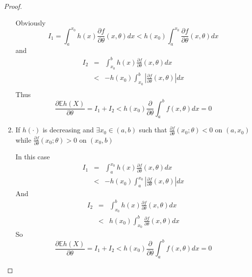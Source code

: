\documentclass{article}
\newcommand{\pd}[2]{
  \frac{\partial #1}{\partial #2}
}
\newcommand{\opd}[1]{
  \frac{\partial}{\partial #1}
}
\newcommand{\E}{
  \mathbb{E}
}
\newcommand{\1}[1]{
  \mathbf{1}_{\{#1\}}
}
\begin{document}
\begin{proof}
\begin{enumerate}
    Obviously
    \[
    I_1 = \int_a^{x_0} h(x) \pd{f}{\theta}(x, \theta) dx
    < h(x_0) \int_a^{x_0} \pd{f}{\theta}(x, \theta) dx
    \]
    and
    \begin{eqnarray*}
      I_2 &=& \int_{x_0}^b h(x) \pd{f}{\theta}(x, \theta) dx \\
      &<& -h(x_0) \int_{x_0}^b \left| \pd{f}{\theta}(x, \theta) \right| dx \\
    \end{eqnarray*}
    Thus
    \[
    \pd{\E h(X)}{\theta}
    = I_1 + I_2
    < h(x_0) \opd{\theta} \int_a^b f(x, \theta) dx = 0
    \]
  \item If $h(\cdot)$ is decreasing and $\exists x_0 \in (a, b)$ such that 
    $\pd{f}{\theta}(x_0; \theta) < 0$ on $(a, x_0)$  while
    $\pd{f}{\theta}(x_0; \theta) > 0$ on $(x_0, b)$

    In this case
    \begin{eqnarray*}
      I_1 &=& \int_a^{x_0} h(x) \pd{f}{\theta}(x, \theta) dx \\
      &<& -h(x_0) \int_a^{x_0} \left| \pd{f}{\theta}(x, \theta) \right| dx
    \end{eqnarray*}
    And
    \begin{eqnarray*}
      I_2 &=& \int_{x_0}^b h(x) \pd{f}{\theta}(x, \theta) dx \\
      &<& h(x_0) \int_{x_0}^b \pd{f}{\theta}(x, \theta) dx
    \end{eqnarray*}
    So
    \[
    \pd{\E h(X)}{\theta}
    = I_1 + I_2
    < h(x_0) \opd{\theta} \int_a^b f(x, \theta) dx = 0
    \]
  \end{enumerate}
\end{proof}
\end{document}
